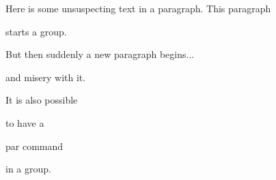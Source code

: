 Here is some unsuspecting text in a paragraph. This paragraph { starts a group.

But then suddenly a new paragraph begins... } and misery with it.

It is also possible {to have a\par par command} in a group.
